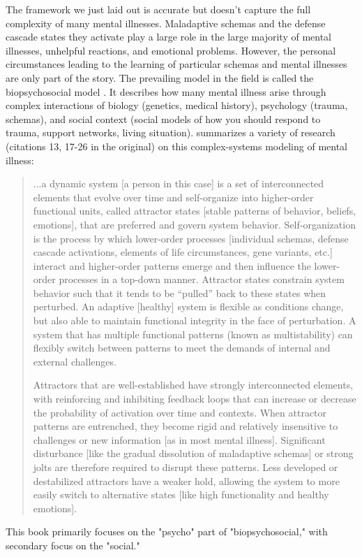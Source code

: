 \documentclass[12pt,letterpaper]{book}
\begin{document}
The framework we just laid out is accurate but doesn't capture the full complexity of many mental illnesses. Maladaptive schemas and the defense cascade states they activate play a large role in the large majority of mental illnesses, unhelpful reactions, and emotional problems. However, the personal circumstances leading to the learning of particular schemas and mental illnesses are only part of the story. The prevailing model in the field is called the biopsychosocial model \cite{engel1977need}. It describes how many mental illness arise through complex interactions of biology (genetics, medical history), psychology (trauma, schemas), and social context (social models of how you should respond to trauma, support networks, living situation). \textcite{hayes2020complex} summarizes a variety of research (citations 13, 17-26 in the original) on this complex-systems modeling of mental illness:
\begin{quotation}
	...a dynamic system [a person in this case] is a set of interconnected elements that evolve over time and self-organize into higher-order functional units, called attractor states [stable patterns of behavior, beliefs, emotions], that are preferred and govern system behavior. Self-organization is the process by which lower-order processes [individual schemas, defense cascade activations, elements of life circumstances, gene variants, etc.] interact and higher-order patterns emerge and then influence the lower-order processes in a top-down manner. Attractor states constrain system behavior such that it tends to be “pulled” back to these states when perturbed. An adaptive [healthy] system is flexible as conditions change, but also able to maintain functional integrity in the face of perturbation. A system that has multiple functional patterns (known as multistability) can flexibly switch between patterns to meet the demands of internal and external challenges.
	
	Attractors that are well-established have strongly interconnected elements, with reinforcing and inhibiting feedback loops that can increase or decrease the probability of activation over time and contexts. When attractor patterns are entrenched, they become rigid and relatively insensitive to challenges or new information [as in most mental illness]. Significant disturbance [like the gradual dissolution of maladaptive schemas] or strong jolts are therefore required to disrupt these patterns. Less developed or destabilized attractors have a weaker hold, allowing the system to more easily switch to alternative states [like high functionality and healthy emotions].
\end{quotation}
This book primarily focuses on the "psycho" part of "biopsychosocial," with secondary focus on the "social."
\end{document}
